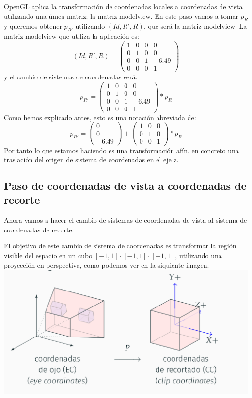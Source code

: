 \documentclass[a4paper,11pt, oneside]{book}
\begin{document}
OpenGL aplica la transformación de coordenadas locales a coordenadas de vista utilizando una única matriz: la matriz modelview. En este paso vamos a tomar $p_R$ y queremos obtener $p_{R'}$ utilizando $(Id, R', R)$, que será la matriz modelview.
La matriz modelview que utiliza la aplicación es:
$$(Id, R', R) = \begin{pmatrix}
	1 & 0 & 0& 0 \\
	0 & 1&0&0 \\
	0&0&1&-6.49 \\
	0&0&0&1
\end{pmatrix}$$
y el cambio de sistemas de coordenadas será:
$$p_{R'} = \begin{pmatrix}
	1 & 0 & 0& 0 \\
	0 & 1&0&0 \\
	0&0&1&-6.49 \\
	0&0&0&1
\end{pmatrix}*p_{R}$$
Como hemos explicado antes, esto es una notación abreviada de:
\begin{equation}
p_{R'} = 
\begin{pmatrix}
0\\
0\\
-6.49
\end{pmatrix}
+
\begin{pmatrix}
1&0&0 \\
0&1&0\\
0&0&1
\end{pmatrix}
*p_R
\end{equation}
Por tanto lo que estamos haciendo es una transformación afín, en concreto una traslación del origen de sistema de coordenadas en el eje z.

\subsection{Paso de coordenadas de vista a coordenadas de recorte}
Ahora vamos a hacer el cambio de sistemas de coordenadas de vista al sistema de coordenadas de recorte.

El objetivo de este cambio de sistema de coordenadas es transformar la región visible del espacio en un cubo $[-1,1]\cdot[-1,1]\cdot[-1,1]$, utilizando una proyección en perspectiva, como podemos ver en la siquiente imagen.
\\

\includegraphics[scale=0.2]{cubo}
\end{document}
